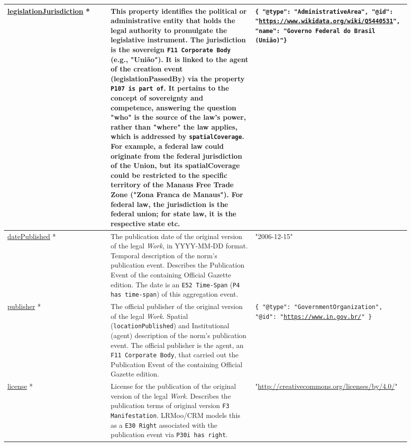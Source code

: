 \documentclass[11pt]{article}
\begin{document}
\begin{longtable}{p{0.25\linewidth} p{0.35\linewidth} p{0.35\linewidth}}
\url{legislationJurisdiction} * & This property identifies the political or administrative entity that holds the legal authority to promulgate the legislative instrument. The jurisdiction is the sovereign \texttt{F11 Corporate Body} (e.g., "União"). It is linked to the agent of the creation event (legislationPassedBy) via the property \texttt{P107 is part of}. \newline It pertains to the concept of sovereignty and competence, answering the question "who" is the source of the law's power, rather than "where" the law applies, which is addressed by \texttt{spatialCoverage}. \newline For example, a federal law could originate from the federal jurisdiction of the Union, but its spatialCoverage could be restricted to the specific territory of the Manaus Free Trade Zone ("Zona Franca de Manaus"). \newline For federal law, the jurisdiction is the federal union; for state law, it is the respective state etc. & \texttt{\{ "@type": "AdministrativeArea", "@id": "\url{https://www.wikidata.org/wiki/Q5440531}", "name": "Governo Federal do Brasil (União)"\}} \\
\midrule

\url{datePublished} * &  The publication date of the original version of the legal \emph{Work}, in YYYY-MM-DD format. \newline Temporal description of the norm's publication event. Describes the Publication Event of the containing Official Gazette edition. The date is an \texttt{E52 Time-Span} (\texttt{P4 has time-span}) of this aggregation event. & "2006-12-15" \\
\midrule

\url{publisher} * & The official publisher of the original version of the legal \emph{Work}. \newline Spatial (\texttt{locationPublished}) and Institutional (agent) description of the norm's publication event. The official publisher is the agent, an \texttt{F11 Corporate Body}, that carried out the Publication Event of the containing Official Gazette edition. & \texttt{\{ "@type": "GovernmentOrganization", "@id": "\url{https://www.in.gov.br/}" \}} \\
\midrule

\url{license} * & License for the publication of the original version of the legal \emph{Work}. Describes the publication terms of original version \texttt{F3 Manifestation}. LRMoo/CRM models this as a \texttt{E30 Right} associated with the publication event via \texttt{P30i has right}. & "\url{http://creativecommons.org/licenses/by/4.0/}" \\
\midrule


\end{longtable}
\end{document}
